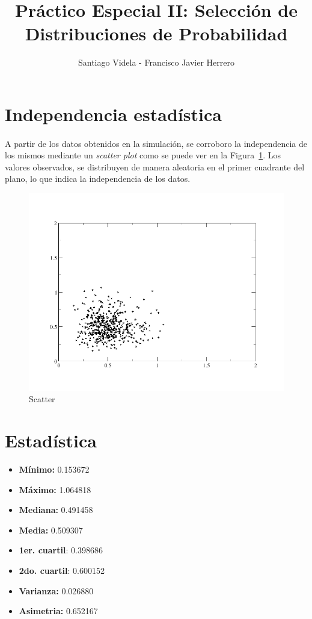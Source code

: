 \documentclass[10pt,a4paper]{article}
\author{Santiago Videla - Francisco Javier Herrero}
\title{Pr\'actico Especial II: Selecci\'on de Distribuciones de Probabilidad}
\begin{document}
\maketitle
\newpage
\tableofcontents
\newpage

\section{Independencia estad\'istica}

\paragraph{}
A partir de los datos obtenidos en la simulaci\'on, se corroboro la
independencia de los mismos mediante un \textit{scatter plot} como se puede ver
en la Figura~\ref{scatter}. Los valores observados, se distribuyen de manera
aleatoria en el primer cuadrante del plano, lo que indica la independencia de
los datos.

\begin{figure}
  \centering
  \includegraphics[scale=0.5]{scatter.png} 
  \caption{Scatter}
  \label{scatter}
\end{figure}

\section{Estad\'istica}

\begin{itemize}
  \item \textbf{M\'inimo:} 0.153672
  \item \textbf{M\'aximo:} 1.064818
  \item \textbf{Mediana:} 0.491458
  \item \textbf{Media:} 0.509307
  \item \textbf{1er. cuartil}: 0.398686
  \item \textbf{2do. cuartil}: 0.600152
  \item \textbf{Varianza:} 0.026880
  \item \textbf{Asimetria:} 0.652167
\end{itemize}
\end{document}
